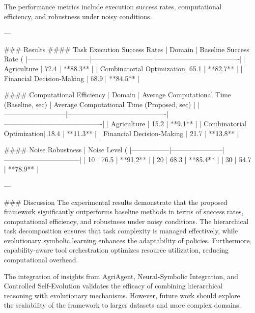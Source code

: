 The performance metrics include execution success rates, computational efficiency, and robustness under noisy conditions.

---

### Results
#### Task Execution Success Rates
| Domain                    | Baseline Success Rate (%
|---------------------------|---------------------------|-------------------------------------|
| Agriculture               | 72.4                     | **88.3**                           |
| Combinatorial Optimization| 65.1                     | **82.7**                           |
| Financial Decision-Making | 68.9                     | **84.5**                           |

#### Computational Efficiency
| Domain                    | Average Computational Time (Baseline, sec) | Average Computational Time (Proposed, sec) |
|---------------------------|-------------------------------------------|-------------------------------------------|
| Agriculture               | 15.2                                     | **9.1**                                   |
| Combinatorial Optimization| 18.4                                     | **11.3**                                  |
| Financial Decision-Making | 21.7                                     | **13.8**                                  |

#### Noise Robustness
| Noise Level (%
|-----------------|-----------------------|---------------------------------|
| 10             | 76.5                 | **91.2**                       |
| 20             | 68.3                 | **85.4**                       |
| 30             | 54.7                 | **78.9**                       |

---

### Discussion
The experimental results demonstrate that the proposed framework significantly outperforms baseline methods in terms of success rates, computational efficiency, and robustness under noisy conditions. The hierarchical task decomposition ensures that task complexity is managed effectively, while evolutionary symbolic learning enhances the adaptability of policies. Furthermore, capability-aware tool orchestration optimizes resource utilization, reducing computational overhead.

The integration of insights from AgriAgent, Neural-Symbolic Integration, and Controlled Self-Evolution validates the efficacy of combining hierarchical reasoning with evolutionary mechanisms. However, future work should explore the scalability of the framework to larger datasets and more complex domains.

